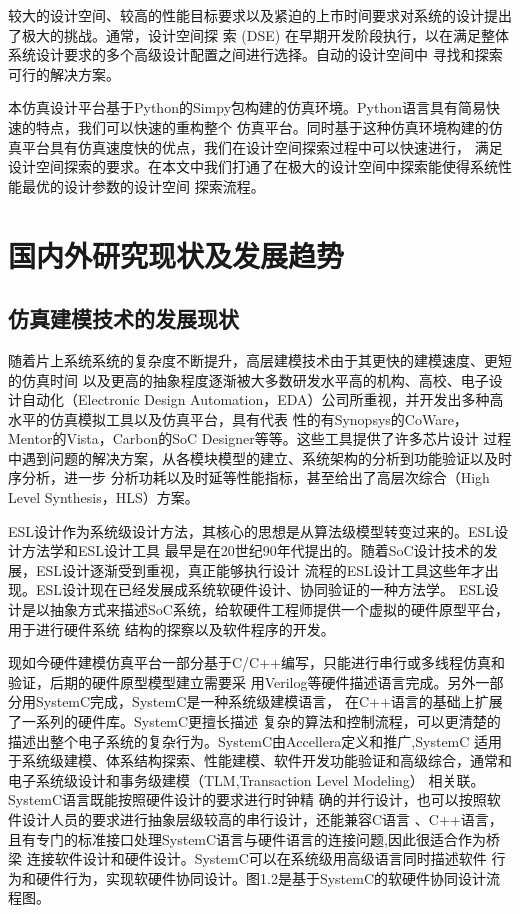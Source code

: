 较大的设计空间、较高的性能目标要求以及紧迫的上市时间要求对系统的设计提出了极大的挑战。通常，设计空间探
索 (DSE)\cite{5} 在早期开发阶段执行，以在满足整体系统设计要求的多个高级设计配置之间进行选择。自动的设计空间中
寻找和探索可行的解决方案。

本仿真设计平台基于Python的Simpy\cite{6}包构建的仿真环境。Python语言具有简易快速的特点，我们可以快速的重构整个
仿真平台。同时基于这种仿真环境构建的仿真平台具有仿真速度快的优点，我们在设计空间探索过程中可以快速进行，
满足设计空间探索的要求。在本文中我们打通了在极大的设计空间中探索能使得系统性能最优的设计参数的设计空间
探索流程。

\section{国内外研究现状及发展趋势}

\subsection{仿真建模技术的发展现状}
随着片上系统系统的复杂度不断提升，高层建模技术由于其更快的建模速度、更短的仿真时间
以及更高的抽象程度逐渐被大多数研发水平高的机构、高校、电子设计自动化（Electronic Design 
Automation，EDA）公司所重视，并开发出多种高水平的仿真模拟工具以及仿真平台，具有代表
性的有Synopsys的CoWare，Mentor的Vista，Carbon的SoC Designer等等。这些工具提供了许多芯片设计
过程中遇到问题的解决方案，从各模块模型的建立、系统架构的分析到功能验证以及时序分析，进一步
分析功耗以及时延等性能指标\cite{38}，甚至给出了高层次综合（High Level Synthesis，HLS）方案。

ESL设计作为系统级设计方法，其核心的思想是从算法级模型转变过来的。ESL设计方法学和ESL设计工具
最早是在20世纪90年代提出的。随着SoC设计技术的发展，ESL设计逐渐受到重视，真正能够执行设计
流程的ESL设计工具这些年才出现。ESL设计现在已经发展成系统软硬件设计、协同验证的一种方法学。
ESL设计是以抽象方式来描述SoC系统，给软硬件工程师提供一个虚拟的硬件原型平台，用于进行硬件系统
结构的探察以及软件程序的开发。

现如今硬件建模仿真平台一部分基于C/C++编写，只能进行串行或多线程仿真和验证，后期的硬件原型模型建立需要采
用Verilog等硬件描述语言完成。另外一部分用SystemC完成，SystemC\cite{7}是一种系统级建模语言，
在C++语言的基础上扩展了一系列的硬件库。SystemC更擅长描述
复杂的算法和控制流程，可以更清楚的描述出整个电子系统的复杂行为。SystemC由Accellera定义和推广,SystemC
适用于系统级建模、体系结构探索、性能建模、软件开发功能验证和高级综合，通常和电子系统级设计和事务级建模（TLM,Transaction Level Modeling）
相关联。SystemC语言既能按照硬件设计的要求进行时钟精
确的并行设计，也可以按照软件设计人员的要求进行抽象层级较高的串行设计，还能兼容C语言
、C++语言，且有专门的标准接口处理SystemC语言与硬件语言的连接问题,因此很适合作为桥梁
连接软件设计和硬件设计\cite{37}。SystemC可以在系统级用高级语言同时描述软件
行为和硬件行为，实现软硬件协同设计\cite{40}。图1.2是基于SystemC的软硬件协同设计流程图。

